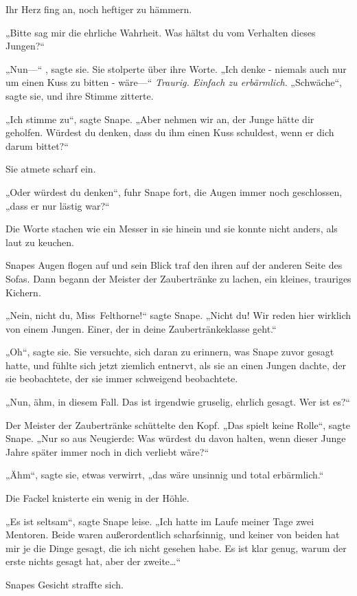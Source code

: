 {Ihr Herz fing an, noch heftiger zu hämmern.

„Bitte sag mir die ehrliche Wahrheit. Was hältst du vom Verhalten dieses Jungen?“

„Nun—“ , sagte sie. Sie stolperte über ihre Worte. „Ich denke - niemals auch nur um einen Kuss zu bitten - wäre—“ \emph{Traurig. Einfach zu erbärmlich}. „Schwäche“, sagte sie, und ihre Stimme zitterte.

„Ich stimme zu“, sagte Snape. „Aber nehmen wir an, der Junge hätte dir geholfen. Würdest du denken, dass du ihm einen Kuss schuldest, wenn er dich darum bittet?“

Sie atmete scharf ein.

„Oder würdest du denken“, fuhr Snape fort, die Augen immer noch geschlossen, „dass er nur lästig war?“

Die Worte stachen wie ein Messer in sie hinein und sie konnte nicht anders, als laut zu keuchen.

Snapes Augen flogen auf und sein Blick traf den ihren auf der anderen Seite des Sofas. Dann begann der Meister der Zaubertränke zu lachen, ein kleines, trauriges Kichern.

„Nein, nicht du, Miss~Felthorne!“ sagte Snape. „Nicht du! Wir reden hier wirklich von einem Jungen. Einer, der in deine Zaubertränkeklasse geht.“

„Oh“, sagte sie. Sie versuchte, sich daran zu erinnern, was Snape zuvor gesagt hatte, und fühlte sich jetzt ziemlich entnervt, als sie an einen Jungen dachte, der sie beobachtete, der sie immer schweigend beobachtete.

„Nun, ähm, in diesem Fall. Das ist irgendwie gruselig, ehrlich gesagt. Wer ist es?“

Der Meister der Zaubertränke schüttelte den Kopf. „Das spielt keine Rolle“, sagte Snape. „Nur so aus Neugierde: Was würdest du davon halten, wenn dieser Junge Jahre später immer noch in dich verliebt wäre?“

„Ähm“, sagte sie, etwas verwirrt, „das wäre unsinnig und total erbärmlich.“

Die Fackel knisterte ein wenig in der Höhle.

„Es ist seltsam“, sagte Snape leise. „Ich hatte im Laufe meiner Tage zwei Mentoren. Beide waren außerordentlich scharfsinnig, und keiner von beiden hat mir je die Dinge gesagt, die ich nicht gesehen habe. Es ist klar genug, warum der erste nichts gesagt hat, aber der zweite…“

Snapes Gesicht straffte sich.

}
